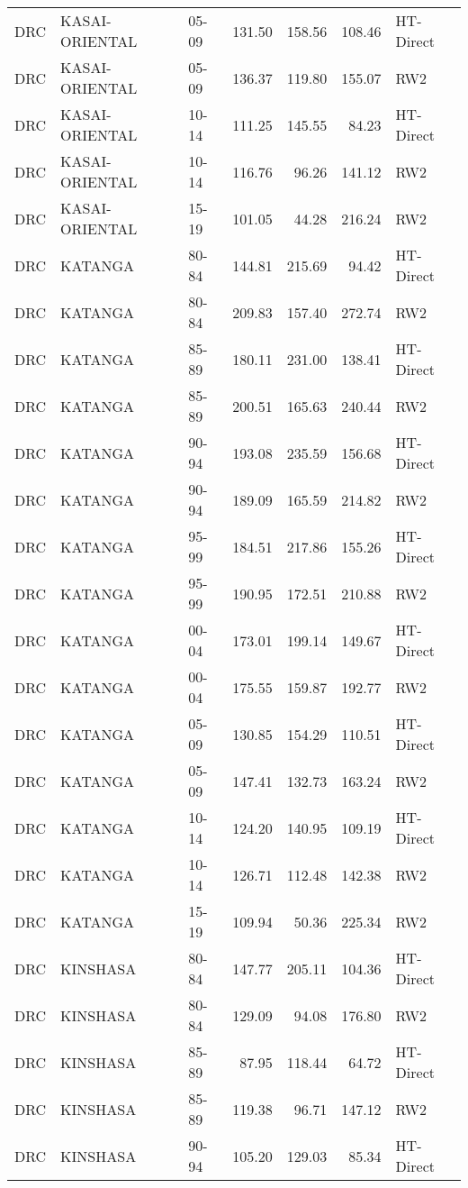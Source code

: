 \begin{longtable}{lllrrrl}
  DRC & KASAI-ORIENTAL & 05-09 & 131.50 & 158.56 & 108.46 & HT-Direct \\ 
  DRC & KASAI-ORIENTAL & 05-09 & 136.37 & 119.80 & 155.07 & RW2 \\ 
  DRC & KASAI-ORIENTAL & 10-14 & 111.25 & 145.55 & 84.23 & HT-Direct \\ 
  DRC & KASAI-ORIENTAL & 10-14 & 116.76 & 96.26 & 141.12 & RW2 \\ 
  DRC & KASAI-ORIENTAL & 15-19 & 101.05 & 44.28 & 216.24 & RW2 \\ 
  DRC & KATANGA & 80-84 & 144.81 & 215.69 & 94.42 & HT-Direct \\ 
  DRC & KATANGA & 80-84 & 209.83 & 157.40 & 272.74 & RW2 \\ 
  DRC & KATANGA & 85-89 & 180.11 & 231.00 & 138.41 & HT-Direct \\ 
  DRC & KATANGA & 85-89 & 200.51 & 165.63 & 240.44 & RW2 \\ 
  DRC & KATANGA & 90-94 & 193.08 & 235.59 & 156.68 & HT-Direct \\ 
  DRC & KATANGA & 90-94 & 189.09 & 165.59 & 214.82 & RW2 \\ 
  DRC & KATANGA & 95-99 & 184.51 & 217.86 & 155.26 & HT-Direct \\ 
  DRC & KATANGA & 95-99 & 190.95 & 172.51 & 210.88 & RW2 \\ 
  DRC & KATANGA & 00-04 & 173.01 & 199.14 & 149.67 & HT-Direct \\ 
  DRC & KATANGA & 00-04 & 175.55 & 159.87 & 192.77 & RW2 \\ 
  DRC & KATANGA & 05-09 & 130.85 & 154.29 & 110.51 & HT-Direct \\ 
  DRC & KATANGA & 05-09 & 147.41 & 132.73 & 163.24 & RW2 \\ 
  DRC & KATANGA & 10-14 & 124.20 & 140.95 & 109.19 & HT-Direct \\ 
  DRC & KATANGA & 10-14 & 126.71 & 112.48 & 142.38 & RW2 \\ 
  DRC & KATANGA & 15-19 & 109.94 & 50.36 & 225.34 & RW2 \\ 
  DRC & KINSHASA & 80-84 & 147.77 & 205.11 & 104.36 & HT-Direct \\ 
  DRC & KINSHASA & 80-84 & 129.09 & 94.08 & 176.80 & RW2 \\ 
  DRC & KINSHASA & 85-89 & 87.95 & 118.44 & 64.72 & HT-Direct \\ 
  DRC & KINSHASA & 85-89 & 119.38 & 96.71 & 147.12 & RW2 \\ 
  DRC & KINSHASA & 90-94 & 105.20 & 129.03 & 85.34 & HT-Direct \\ 

\end{longtable}
